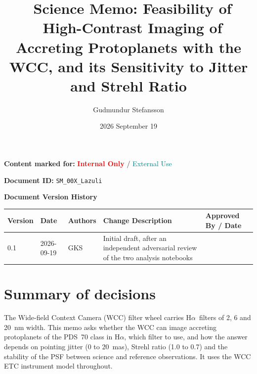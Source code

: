 \documentclass[11pt]{article}
\title{\observatory\ Science Memo: Feasibility of \Ha\ High-Contrast Imaging of Accreting Protoplanets with the WCC, and its Sensitivity to Jitter and Strehl Ratio}
\author{Gudmundur Stefansson \\}
\date{2026 September 19}
\newcommand{\docidprefix}{SM\_00X\_Lazuli}
\newcommand{\Ha}{H$\alpha$}
\begin{document}
\maketitle
\thispagestyle{fancy}

\begin{center}
\begin{tcolorbox}[colback=gray!10!white, colframe=gray!50!black, boxrule=0.5pt, width=0.9\textwidth]
\centering
\textbf{Content marked for:} \textcolor{red}{\textbf{Internal Only}} / \textcolor{teal}{External Use}
\end{tcolorbox}
\end{center}

\begin{center}
\textbf{Document ID:} \texttt{\docidprefix}
\end{center}

\vspace{1em}
\noindent
\textbf{Document Version History}
\vspace{0.5em}

\begin{tabular}{|p{1.3cm}|p{2.2cm}|p{2.2cm}|p{4.2cm}|p{3.8cm}|}
\hline
\textbf{Version} & \textbf{Date} & \textbf{Authors} & \textbf{Change Description} & \textbf{Approved By / Date} \\
\hline
0.1 & 2026-09-19 & GKS & Initial draft, after an independent adversarial review of the two analysis notebooks & \\
\hline
\end{tabular}

\vspace{1.5em}

\section*{Summary of decisions}

The Wide-field Context Camera (WCC) filter wheel carries \Ha\ filters of 2, 6 and 20~nm width. This memo asks whether the WCC can image accreting protoplanets of the PDS~70 class in \Ha, which filter to use, and how the answer depends on pointing jitter (0 to 20~mas), Strehl ratio (1.0 to 0.7) and the stability of the PSF between science and reference observations. It uses the WCC ETC instrument model throughout.
\end{document}
